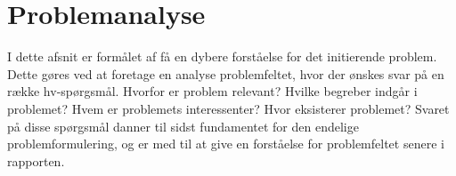 \section{Problemanalyse}
I dette afsnit er formålet af få en dybere forståelse for det initierende problem. Dette gøres ved at foretage en analyse problemfeltet, hvor der ønskes svar på en række hv-spørgsmål. Hvorfor er problem relevant? Hvilke begreber indgår i problemet? Hvem er problemets interessenter? Hvor eksisterer problemet? Svaret på disse spørgsmål danner til sidst fundamentet for den endelige problemformulering, og er med til at give en forståelse for problemfeltet senere i rapporten.


\clearpage

\clearpage

\clearpage

\clearpage